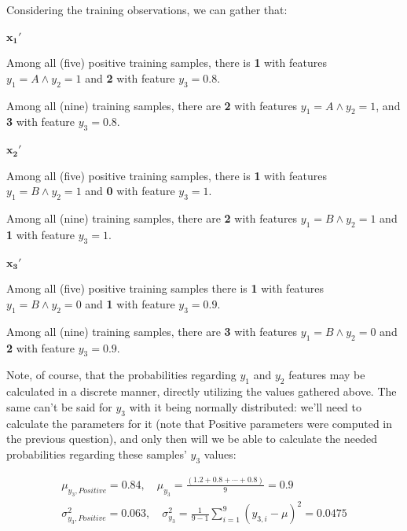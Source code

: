 \documentclass[12pt]{article}
\begin{document}
\begin{enumerate}[leftmargin=\labelsep]
        Considering the training observations, we can gather that:

        \begin{multicols}{3}
          \setlength{\columnseprule}{1pt}
          \def\columnseprulecolor{\color{black}}
          \centering

          $\mathbf{x_1'}$

          Among all (five) positive training samples, there is \textbf{1} with features $y_1 = A \wedge y_2 = 1$ and
          \textbf{2} with feature $y_3 = 0.8$.

          Among all (nine) training samples, there are \textbf{2} with features $y_1 = A \wedge y_2 = 1$, and
          \textbf{3} with feature $y_3 = 0.8$.

          \columnbreak

          $\mathbf{x_2'}$

          Among all (five) positive training samples, there is \textbf{1} with features $y_1 = B \wedge y_2 = 1$ and
          \textbf{0} with feature $y_3 = 1$.

          Among all (nine) training samples, there are \textbf{2} with features $y_1 = B \wedge y_2 = 1$ and
          \textbf{1} with feature $y_3 = 1$.

          \columnbreak

          $\mathbf{x_3'}$

          Among all (five) positive training samples there is \textbf{1} with features $y_1 = B \wedge y_2 = 0$ and
          \textbf{1} with feature $y_3 = 0.9$.

          Among all (nine) training samples, there are \textbf{3} with features $y_1 = B \wedge y_2 = 0$ and
          \textbf{2} with feature $y_3 = 0.9$.

        \end{multicols}

        Note, of course, that the probabilities regarding $y_1$ and $y_2$ features may
        be calculated in a discrete manner, directly utilizing the values gathered above.
        The same can't be said for $y_3$ with it being normally distributed:
        we'll need to calculate the parameters for it (note that Positive parameters were computed in the
        previous question), and only then will we be able to calculate the needed probabilities regarding
        these samples' $y_3$ values:

        \begin{align}
          \mu_{y_3, Positive} = 0.84, \quad \mu_{y_3} = \frac{(1.2 + 0.8 + \cdots + 0.8)}{9} = 0.9 \\
          \sigma_{y_3, Positive}^2 = 0.063, \quad \sigma_{y_3}^2 = \frac{1}{9 - 1} \sum_{i=1}^{9} (y_{3, i} - \mu)^2 = 0.0475
        \end{align}


\end{enumerate}
\end{document}
